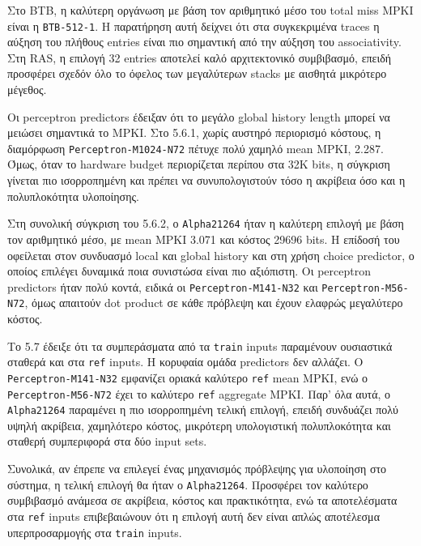 \documentclass{article}
\begin{document}
Στο BTB, η καλύτερη οργάνωση με βάση τον αριθμητικό μέσο του total miss MPKI είναι η \texttt{BTB-512-1}. Η παρατήρηση αυτή δείχνει ότι στα συγκεκριμένα traces η αύξηση του πλήθους entries είναι πιο σημαντική από την αύξηση του associativity. Στη RAS, η επιλογή 32 entries αποτελεί καλό αρχιτεκτονικό συμβιβασμό, επειδή προσφέρει σχεδόν όλο το όφελος των μεγαλύτερων stacks με αισθητά μικρότερο μέγεθος.

Οι perceptron predictors έδειξαν ότι το μεγάλο global history length μπορεί να μειώσει σημαντικά το MPKI. Στο 5.6.1, χωρίς αυστηρό περιορισμό κόστους, η διαμόρφωση \texttt{Perceptron-M1024-N72} πέτυχε πολύ χαμηλό mean MPKI, 2.287. Όμως, όταν το hardware budget περιορίζεται περίπου στα 32K bits, η σύγκριση γίνεται πιο ισορροπημένη και πρέπει να συνυπολογιστούν τόσο η ακρίβεια όσο και η πολυπλοκότητα υλοποίησης.

Στη συνολική σύγκριση του 5.6.2, ο \texttt{Alpha21264} ήταν η καλύτερη επιλογή με βάση τον αριθμητικό μέσο, με mean MPKI 3.071 και κόστος 29696 bits. Η επίδοσή του οφείλεται στον συνδυασμό local και global history και στη χρήση choice predictor, ο οποίος επιλέγει δυναμικά ποια συνιστώσα είναι πιο αξιόπιστη. Οι perceptron predictors ήταν πολύ κοντά, ειδικά οι \texttt{Perceptron-M141-N32} και \texttt{Perceptron-M56-N72}, όμως απαιτούν dot product σε κάθε πρόβλεψη και έχουν ελαφρώς μεγαλύτερο κόστος.

Το 5.7 έδειξε ότι τα συμπεράσματα από τα \texttt{train} inputs παραμένουν ουσιαστικά σταθερά και στα \texttt{ref} inputs. Η κορυφαία ομάδα predictors δεν αλλάζει. Ο \texttt{Perceptron-M141-N32} εμφανίζει οριακά καλύτερο \texttt{ref} mean MPKI, ενώ ο \texttt{Perceptron-M56-N72} έχει το καλύτερο \texttt{ref} aggregate MPKI. Παρ' όλα αυτά, ο \texttt{Alpha21264} παραμένει η πιο ισορροπημένη τελική επιλογή, επειδή συνδυάζει πολύ υψηλή ακρίβεια, χαμηλότερο κόστος, μικρότερη υπολογιστική πολυπλοκότητα και σταθερή συμπεριφορά στα δύο input sets.

Συνολικά, αν έπρεπε να επιλεγεί ένας μηχανισμός πρόβλεψης για υλοποίηση στο σύστημα, η τελική επιλογή θα ήταν ο \texttt{Alpha21264}. Προσφέρει τον καλύτερο συμβιβασμό ανάμεσα σε ακρίβεια, κόστος και πρακτικότητα, ενώ τα αποτελέσματα στα \texttt{ref} inputs επιβεβαιώνουν ότι η επιλογή αυτή δεν είναι απλώς αποτέλεσμα υπερπροσαρμογής στα \texttt{train} inputs.
\end{document}
